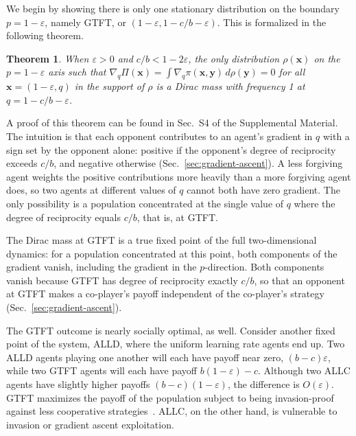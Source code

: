 \documentclass[10pt]{article}
\newtheorem{theorem}{Theorem}
\newcommand{\eps}{\varepsilon}
\begin{document}
We begin by showing there is only one stationary distribution on the boundary $p=1-\eps$, namely GTFT, or $(1-\eps, 1-c/b-\eps)$. This is formalized in the following theorem.
\begin{theorem}
    When $\eps>0$ and $c/b < 1-2\eps$, the only distribution $\rho(\mathbf{x})$ on the $p = 1-\eps$ axis such that $\nabla_q \Pi(\mathbf{x}) =\int \nabla_q \pi(\mathbf{x}, \mathbf{y}) \, d\rho(\mathbf{y}) = 0$ for all $\mathbf{x} = (1-\eps, q)$ in the support of $\rho$ is a Dirac mass with frequency 1 at $q = 1-c/b-\eps$.
    \label{thm:GTFT}
\end{theorem} \noindent A proof of this theorem can be found in Sec.~S4 of the Supplemental Material. The intuition is that each opponent contributes to an agent's gradient in $q$ with a sign set by the opponent alone: positive if the opponent's degree of reciprocity exceeds $c/b$, and negative otherwise (Sec.~\ref{sec:gradient-ascent}). A less forgiving agent weights the positive contributions more heavily than a more forgiving agent does, so two agents at different values of $q$ cannot both have zero gradient. The only possibility is a population concentrated at the single value of $q$ where the degree of reciprocity equals $c/b$, that is, at GTFT.

The Dirac mass at GTFT is a true fixed point of the full two-dimensional dynamics: for a population concentrated at this point, both components of the gradient vanish, including the gradient in the $p$-direction. Both components vanish because GTFT has degree of reciprocity exactly $c/b$, so that an opponent at GTFT makes a co-player's payoff independent of the co-player's strategy (Sec.~\ref{sec:gradient-ascent}).

The GTFT outcome is nearly socially optimal, as well. Consider another fixed point of the system, ALLD, where the uniform learning rate agents end up. Two ALLD agents playing one another will each have payoff near zero, $(b-c)\eps$, while two GTFT agents will each have payoff $b(1-\eps) - c$. Although two ALLC agents have slightly higher payoffs $(b-c)(1-\eps)$, the difference is $O(\eps)$. GTFT maximizes the payoff of the population subject to being invasion-proof against less cooperative strategies~\cite{nowak1990-EvolutionStochasticStrategies}. ALLC, on the other hand, is vulnerable to invasion or gradient ascent exploitation.
\end{document}
